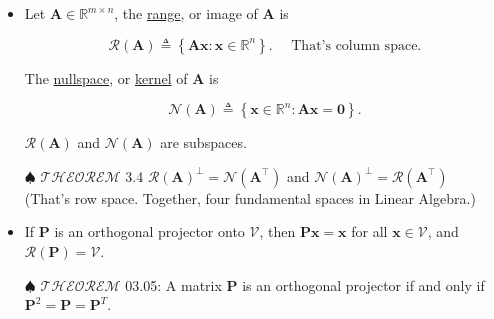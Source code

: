 \documentclass[12pt,thmsa]{article}
\begin{document}
\begin{itemize}
	\item Let \(\boldsymbol{A} \in \mathbb{R}^{m \times n}\), the \underline{range}, or image of \(\boldsymbol{A}\) is
	
	\begin{equation*}
		\mathcal{R}(\boldsymbol{A}) \triangleq\left\{\boldsymbol{A} \boldsymbol{x}: \boldsymbol{x} \in \mathbb{R}^{n}\right\}.  \quad \text { That's column space.}
	\end{equation*}
	
	The \underline{nullspace}, or \underline{kernel} of \(\boldsymbol{A}\) is
	
	\begin{equation*}
		\mathcal{N}(\boldsymbol{A}) \triangleq\left\{\boldsymbol{x} \in \mathbb{R}^{n}: \boldsymbol{A} \boldsymbol{x}=\mathbf{0}\right\}.
	\end{equation*}
	
	\(\mathcal{R}(\boldsymbol{A})\) and \(\mathcal{N}(\boldsymbol{A})\) are subspaces.
	
	\item[\(\spadesuit\)] \(\mathscr{THEOREM}\) 3.4 \(\mathcal{R}(\boldsymbol{A})^{\perp}=\mathcal{N}\left(\boldsymbol{A}^{\top}\right)\) and \(\mathcal{N}(\boldsymbol{A})^{\perp}=\mathcal{R}\left(\boldsymbol{A}^{\top}\right) \quad\) (That's row space. Together, four fundamental spaces in Linear Algebra.)
	
	\item If \(\boldsymbol{P}\) is an orthogonal projector onto \(\mathcal{V}\), then \(\boldsymbol{P} \boldsymbol{x}=\boldsymbol{x}\) for all \(\boldsymbol{x} \in \mathcal{V}\), and \(\mathcal{R}(\boldsymbol{P})=\mathcal{V}\).
	
	\item[\(\spadesuit\)] \(\mathscr{THEOREM}\) 03.05: A matrix \(\boldsymbol{P}\) is an orthogonal projector if and only if \(\boldsymbol{P}^{2}=\boldsymbol{P}=\boldsymbol{P}^{T}\).
\end{itemize}


\end{document}
